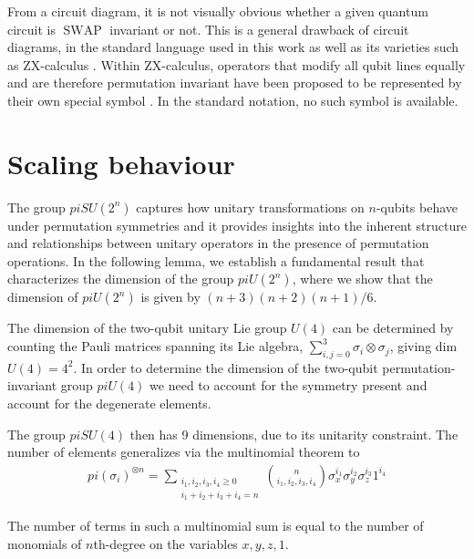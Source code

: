 \documentclass[%
 reprint,
 amsmath,amssymb,
 aps,
]{revtex4-2}
\newcommand{\SWAP}{\operatorname{SWAP}}
\theoremstyle{definition}%
\begin{document}
From a circuit diagram, it is not visually obvious whether a given quantum circuit is $\SWAP$ invariant or not. This is a general drawback of circuit diagrams, in the standard language used in this work as well as its varieties such as ZX-calculus \cite{van_de_wetering_zx-calculus_2020}. Within ZX-calculus, operators that modify all qubit lines equally and are therefore permutation invariant have been proposed to be represented by their own special symbol \cite{cowtan_phase_2020}. In the standard notation, no such symbol is available.


\section{Scaling behaviour}\label{sec:scaling}


The group $piSU(2^n)$ captures  how unitary transformations on $n$-qubits behave under permutation symmetries and it provides insights into the inherent structure and relationships between unitary operators in the presence of permutation operations. In the following lemma, we establish a fundamental result that characterizes the dimension of the group $piU(2^n)$, where we show that the dimension of $piU(2^n)$ is given by $(n+3)(n+2)(n+1)/6$.

The dimension of the two-qubit unitary Lie group $U(4)$ can be determined by counting the Pauli matrices spanning its Lie algebra, $\sum_{i,j=0}^{3}\sigma_i\otimes\sigma_j$, giving dim $U(4)=4^2$. In order to determine the dimension of the two-qubit permutation-invariant group $piU(4)$ we need to account for the symmetry present and account for the degenerate elements.

The group $piSU(4)$ then has 9 dimensions, due to its unitarity constraint. The number of elements generalizes via the multinomial theorem \cite{brualdi_introductory_2008} to
\begin{align}
    pi(\sigma_i)^{\otimes n} = \sum_{\substack{i_1,i_2,i_3,i_4\geq 0 \\ i_1+i_2+i_3+i_4= n}}\binom{n}{i_1,i_2,i_3,i_4}\sigma_x^{i_1}\sigma_y^{i_2}\sigma_z^{i_3}1^{i_4}
\end{align}

The number of terms in such a multinomial sum is equal to the number of monomials of $n$th-degree on the variables $x,y,z,1$.
\end{document}
